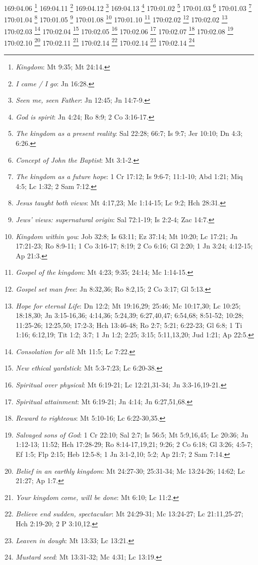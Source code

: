 169:04.06 \footnote{\textit{Kingdom}: Mt 9:35; Mt 24:14.}
169:04.11 \footnote{\textit{I came / I go}: Jn 16:28.}
169:04.12 \footnote{\textit{Seen me, seen Father}: Jn 12:45; Jn 14:7-9.}
169:04.13 \footnote{\textit{God is spirit}: Jn 4:24; Ro 8:9; 2 Co 3:16-17.}
170:01.02 \footnote{\textit{The kingdom as a present reality}: Sal 22:28; 66:7; Is 9:7; Jer 10:10; Dn 4:3; 6:26.}
170:01.03 \footnote{\textit{Concept of John the Baptist}: Mt 3:1-2.}
170:01.03 \footnote{\textit{The kingdom as a future hope}: 1 Cr 17:12; Is 9:6-7; 11:1-10; Abd 1:21; Miq 4:5; Lc 1:32; 2 Sam 7:12.}
170:01.04 \footnote{\textit{Jesus taught both views}: Mt 4:17,23; Mc 1:14-15; Lc 9:2; Hch 28:31.}
170:01.05 \footnote{\textit{Jews' views: supernatural origin}: Sal 72:1-19; Is 2:2-4; Zac 14:7.}
170:01.08 \footnote{\textit{Kingdom within you}: Job 32:8; Is 63:11; Ez 37:14; Mt 10:20; Lc 17:21; Jn 17:21-23; Ro 8:9-11; 1 Co 3:16-17; 8:19; 2 Co 6:16; Gl 2:20; 1 Jn 3:24; 4:12-15; Ap 21:3.}
170:01.10 \footnote{\textit{Gospel of the kingdom}: Mt 4:23; 9:35; 24:14; Mc 1:14-15.}
170:02.02 \footnote{\textit{Gospel set man free}: Jn 8:32,36; Ro 8:2,15; 2 Co 3:17; Gl 5:13.}
170:02.02 \footnote{\textit{Hope for eternal Life}: Dn 12:2; Mt 19:16,29; 25:46; Mc 10:17,30; Lc 10:25; 18:18,30; Jn 3:15-16,36; 4:14,36; 5:24,39; 6:27,40,47; 6:54,68; 8:51-52; 10:28; 11:25-26; 12:25,50; 17:2-3; Hch 13:46-48; Ro 2:7; 5:21; 6:22-23; Gl 6:8; 1 Ti 1:16; 6:12,19; Tit 1:2; 3:7; 1 Jn 1:2; 2:25; 3:15; 5:11,13,20; Jud 1:21; Ap 22:5.}
170:02.03 \footnote{\textit{Consolation for all}: Mt 11:5; Lc 7:22.}
170:02.04 \footnote{\textit{New ethical yardstick}: Mt 5:3-7:23; Lc 6:20-38.}
170:02.05 \footnote{\textit{Spiritual over physical}: Mt 6:19-21; Lc 12:21,31-34; Jn 3:3-16,19-21.}
170:02.06 \footnote{\textit{Spiritual attainment}: Mt 6:19-21; Jn 4:14; Jn 6:27,51,68.}
170:02.07 \footnote{\textit{Reward to righteous}: Mt 5:10-16; Lc 6:22-30,35.}
170:02.08 \footnote{\textit{Salvaged sons of God}: 1 Cr 22:10; Sal 2:7; Is 56:5; Mt 5:9,16,45; Lc 20:36; Jn 1:12-13; 11:52; Hch 17:28-29; Ro 8:14-17,19,21; 9:26; 2 Co 6:18; Gl 3:26; 4:5-7; Ef 1:5; Flp 2:15; Heb 12:5-8; 1 Jn 3:1-2,10; 5:2; Ap 21:7; 2 Sam 7:14.}
170:02.10 \footnote{\textit{Belief in an earthly kingdom}: Mt 24:27-30; 25:31-34; Mc 13:24-26; 14:62; Lc 21:27; Ap 1:7.}
170:02.11 \footnote{\textit{Your kingdom come, will be done}: Mt 6:10; Lc 11:2.}
170:02.14 \footnote{\textit{Believe end sudden, spectacular}: Mt 24:29-31; Mc 13:24-27; Lc 21:11,25-27; Hch 2:19-20; 2 P 3:10,12.}
170:02.14 \footnote{\textit{Leaven in dough}: Mt 13:33; Lc 13:21.}
170:02.14 \footnote{\textit{Mustard seed}: Mt 13:31-32; Mc 4:31; Lc 13:19.}
